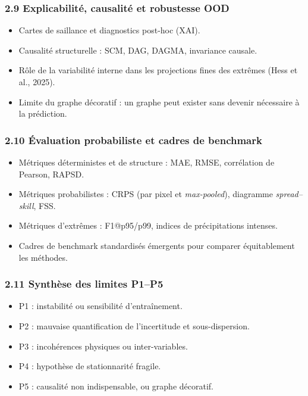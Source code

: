 \documentclass[12pt,a4paper]{article}
\begin{document}
\subsubsection*{2.9 Explicabilit\'e, causalit\'e et robustesse OOD}
\begin{itemize}
    \item Cartes de saillance et diagnostics post-hoc (XAI).
    \item Causalit\'e structurelle : SCM, DAG, DAGMA, invariance causale.
    \item R\^ole de la variabilit\'e interne dans les projections fines des extr\^emes (Hess et al., 2025).
    \item Limite du graphe d\'ecoratif : un graphe peut exister sans devenir n\'ecessaire \`a la pr\'ediction.
\end{itemize}

\subsubsection*{2.10 \'Evaluation probabiliste et cadres de benchmark}
\begin{itemize}
    \item M\'etriques d\'eterministes et de structure : MAE, RMSE, corr\'elation de Pearson, RAPSD.
    \item M\'etriques probabilistes : CRPS (par pixel et \emph{max-pooled}), diagramme \emph{spread--skill}, FSS.
    \item M\'etriques d'extr\^emes : F1@p95/p99, indices de pr\'ecipitations intenses.
    \item Cadres de benchmark standardis\'es \'emergents pour comparer \'equitablement les m\'ethodes.
\end{itemize}

\subsubsection*{2.11 Synth\`ese des limites P1--P5}
\begin{itemize}
    \item P1 : instabilit\'e ou sensibilit\'e d'entra\^inement.
    \item P2 : mauvaise quantification de l'incertitude et sous-dispersion.
    \item P3 : incoh\'erences physiques ou inter-variables.
    \item P4 : hypoth\`ese de stationnarit\'e fragile.
    \item P5 : causalit\'e non indispensable, ou graphe d\'ecoratif.
\end{itemize}
\end{document}

